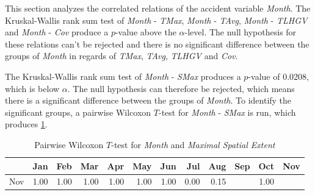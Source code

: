 This section analyzes the correlated relations of the accident variable \textit{Month}. The Kruskal-Wallis rank sum test of \textit{Month} - \textit{TMax}, \textit{Month} - \textit{TAvg}, \textit{Month} - \textit{TLHGV} and \textit{Month} - \textit{Cov} produce a $p$-value above the $\alpha$-level. The null hypothesis for these relations can't be rejected and there is no significant difference between the groups of \textit{Month} in regards of \textit{TMax}, \textit{TAvg}, \textit{TLHGV} and \textit{Cov}.

The Kruskal-Wallis rank sum test of \textit{Month} - \textit{SMax} produces a $p$-value of 0.0208, which is below $\alpha$. The null hypothesis can therefore be rejected, which means there is a significant difference between the groups of \textit{Month}. To identify the significant groups, a pairwise Wilcoxon $T$-test for \textit{Month} - \textit{SMax} is run, which produces \cref{tbl:wilcoxon_baysis_effector_Month_SMax}. 
\begin{table}[ht!]
	\tiny
	\centering
	\begin{tabular}{rrrrrrrrrrrr}
		\toprule
		    & Jan & Feb & Mar & Apr & May & Jun & Jul & Aug & Sep & Oct & Nov \\ 
		\midrule
		Nov & 1.00 & 1.00 & 1.00 & 1.00 & 1.00 & 1.00 & 0.00 & 0.15 & \red{0.01} & 1.00 &  \\ 
		\bottomrule
	\end{tabular}
    \caption{Pairwise Wilcoxon $T$-test for \textit{Month} and \textit{Maximal Spatial Extent}}
    \label{tbl:wilcoxon_baysis_effector_Month_SMax}
\end{table}
